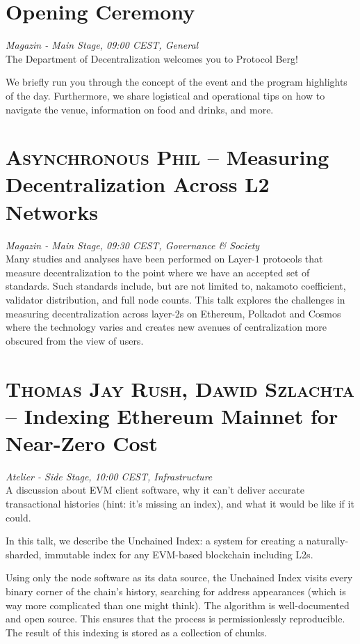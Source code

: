 
\section {Opening Ceremony
} \noindent \textit {Magazin - Main Stage, 09:00 CEST, General
}\\[1em] The Department of Decentralization welcomes you to Protocol Berg!

We briefly run you through the concept of the event and the program highlights of the day. Furthermore, we share logistical and operational tips on how to navigate the venue, information on food and drinks, and more.
\clearpage
\section {\textsc{Asynchronous Phil} -- Measuring Decentralization Across L2 Networks
} \noindent \textit {Magazin - Main Stage, 09:30 CEST, Governance \&
 Society
}\\[1em] Many studies and analyses have been performed on Layer-1 protocols that measure decentralization to the point where we have an accepted set of standards. Such standards include, but are not limited to, nakamoto coefficient, validator distribution, and full node counts. This talk explores the challenges in measuring decentralization across layer-2s on Ethereum, Polkadot and Cosmos where the technology varies and creates new avenues of centralization more obscured from the view of users.
\clearpage
\section {\textsc{Thomas Jay Rush, Dawid Szlachta} -- Indexing Ethereum Mainnet for Near-Zero Cost
} \noindent \textit {Atelier - Side Stage, 10:00 CEST, Infrastructure
}\\[1em] A discussion about EVM client software, why it can't deliver accurate transactional histories (hint: it's missing an index), and what it would be like if it could.
\par In this talk, we describe the Unchained Index: a system for creating a naturally-sharded, immutable index for any EVM-based blockchain including L2s.

Using only the node software as its data source, the Unchained Index visits every binary corner of the chain's history, searching for address appearances (which is way more complicated than one might think). The algorithm is well-documented and open source. This ensures that the process is permissionlessly reproducible. The result of this indexing is stored as a collection of chunks.


